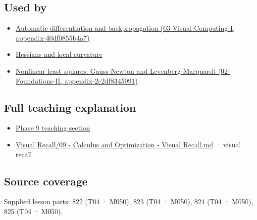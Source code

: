 \subsection{Used by}\label{used-by}

\begin{itemize}
\tightlist
\item
  \href{}{Automatic differentiation and backpropagation (03-Visual-Computing-I, appendix-40df0855b4a7)}
\item
  \hyperref[appendix-6ac071f8b50c]{Hessians and local curvature}
\item
  \href{}{Nonlinear least squares: Gauss-Newton and Levenberg-Marquardt (02-Foundations-II, appendix-2c2df8345991)}
\end{itemize}

\subsection{Full teaching explanation}\label{full-teaching-explanation}

\begin{itemize}
\tightlist
\item
  \href{Continuous\%20Notes/Computing\%20Foundations\%20-\%20From\%20Bits\%20to\%20C++\%20and\%20Systems\%20APIs\#Jacobians,\%20curvature,\%20and\%20local\%20approximation}{Phase 9 teaching section}
\item
  \hyperref[appendix-adf48f5dc5c1]{Visual Recall/09 - Calculus and Optimization - Visual Recall.md} · visual recall
\end{itemize}

\subsection{Source coverage}\label{source-coverage}

Supplied lesson parts: 822 (T04 · M050), 823 (T04 · M050), 824 (T04 · M050), 825 (T04 · M050).
